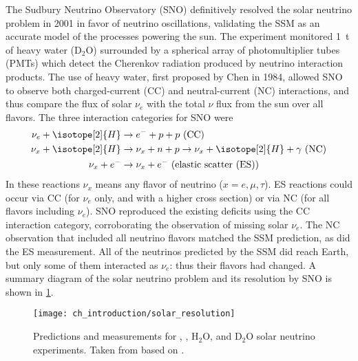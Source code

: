 The Sudbury Neutrino Observatory (SNO) definitively resolved
the solar neutrino problem in 2001 in favor of neutrino oscillations,
validating the SSM as an accurate model of the processes powering the sun.
The experiment monitored \SI{1}{\tonne} of heavy water ($\text{D}_2\text{O}$)
surrounded by a spherical array of photomultiplier tubes (PMTs)
which detect the Cherenkov radiation produced by neutrino interaction products.
The use of heavy water, first proposed by Chen in 1984, 
allowed SNO to observe both charged-current (CC)
and neutral-current (NC) interactions,
and thus compare the flux of solar $\nu_e$ with the total $\nu$ flux
from the sun over all flavors.
The three interaction categories for SNO were
\begin{align}\label{eq:sno_interactions}
    \begin{split}
        \nu_e + \isotope[2]{H} & \to e^- + p + p \text{ (CC)} \\
        \nu_x + \isotope[2]{H} & \to \nu_x + n + p
        \to \nu_x + \isotope[2]{H} + \gamma \text{ (NC)} \\
        \nu_x + e^- & \to \nu_x + e^- \text{ (elastic scatter (ES))}
    \end{split}
\end{align}
In these reactions $\nu_x$ means any flavor of neutrino ($x = e,\mu,\tau$).
ES reactions could occur via CC (for $\nu_e$ only, and with a higher cross section)
or via NC (for all flavors including $\nu_e$).
SNO reproduced the existing deficits using the CC interaction category,
corroborating the observation of missing solar $\nu_e$.
The NC observation that included all neutrino flavors matched the SSM prediction,
as did the ES measurement.
All of the neutrinos predicted by the SSM did reach Earth,
but only some of them interacted as $\nu_e$: thus their flavors had changed.
A summary diagram of the solar neutrino problem and its resolution by SNO
is shown in \cref{fig:solar_neutrino_fixed}.

\begin{figure}
    \texttt{[image: ch\_introduction/solar\_resolution]}
    \caption{
        Predictions and measurements for , ,
        $\text{H}_2\text{O}$, and $\text{D}_2\text{O}$ solar neutrino experiments.
        Taken from \cite{bahcall_images} based on \cite{bahcall2005_diagram}.
    }
    \label{fig:solar_neutrino_fixed}
\end{figure}



